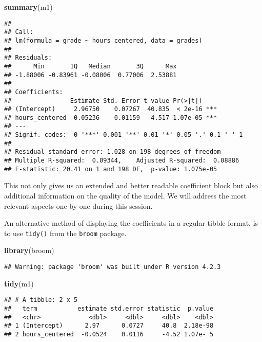 \documentclass[
]{book}
\newenvironment{Shaded}{\begin{snugshade}}{\end{snugshade}}
\newcommand{\FunctionTok}[1]{\textcolor[rgb]{0.13,0.29,0.53}{\textbf{#1}}}
\newcommand{\NormalTok}[1]{#1}
\begin{document}
\begin{Shaded}
\begin{Highlighting}[]
\FunctionTok{summary}\NormalTok{(m1)}
\end{Highlighting}
\end{Shaded}

\begin{verbatim}
## 
## Call:
## lm(formula = grade ~ hours_centered, data = grades)
## 
## Residuals:
##      Min       1Q   Median       3Q      Max 
## -1.88006 -0.83961 -0.08006  0.77006  2.53881 
## 
## Coefficients:
##                Estimate Std. Error t value Pr(>|t|)    
## (Intercept)     2.96750    0.07267  40.835  < 2e-16 ***
## hours_centered -0.05236    0.01159  -4.517 1.07e-05 ***
## ---
## Signif. codes:  0 '***' 0.001 '**' 0.01 '*' 0.05 '.' 0.1 ' ' 1
## 
## Residual standard error: 1.028 on 198 degrees of freedom
## Multiple R-squared:  0.09344,    Adjusted R-squared:  0.08886 
## F-statistic: 20.41 on 1 and 198 DF,  p-value: 1.075e-05
\end{verbatim}

This not only gives us an extended and better readable coefficient block but
also additional information on the quality of the model. We will address the
most relevant aspects one by one during this session.

An alternative method of displaying the coefficients in a regular tibble format,
is to use \texttt{tidy()} from the \texttt{broom} package.

\begin{Shaded}
\begin{Highlighting}[]
\FunctionTok{library}\NormalTok{(broom)}
\end{Highlighting}
\end{Shaded}

\begin{verbatim}
## Warning: package 'broom' was built under R version 4.2.3
\end{verbatim}

\begin{Shaded}
\begin{Highlighting}[]
\FunctionTok{tidy}\NormalTok{(m1)}
\end{Highlighting}
\end{Shaded}

\begin{verbatim}
## # A tibble: 2 x 5
##   term           estimate std.error statistic  p.value
##   <chr>             <dbl>     <dbl>     <dbl>    <dbl>
## 1 (Intercept)      2.97      0.0727     40.8  2.18e-98
## 2 hours_centered  -0.0524    0.0116     -4.52 1.07e- 5
\end{verbatim}
\end{document}
